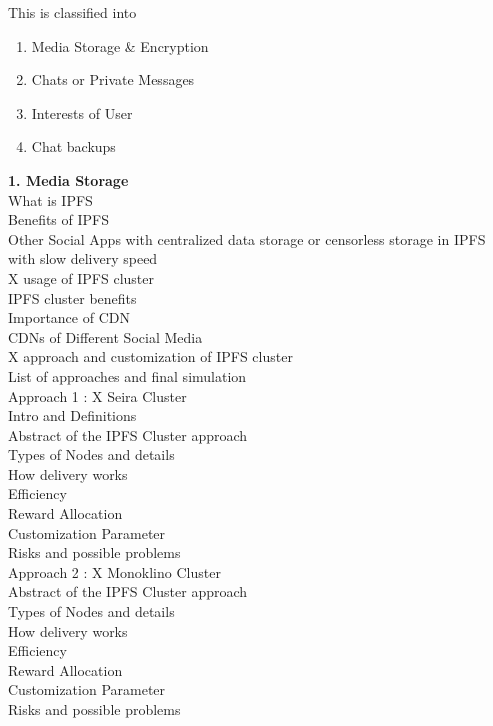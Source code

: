 \documentclass[letterpaper,11pt]{article}
\begin{document}
This is classified into
\begin{enumerate}[wide, labelwidth=!, labelindent=0pt]
\item Media Storage \& Encryption
\item Chats or Private Messages
\item Interests of User
\item Chat backups
\end{enumerate}


\textbf{1. Media Storage}\\

What is IPFS\\
Benefits of IPFS\\
Other Social Apps with centralized data storage or censorless storage in IPFS with slow delivery speed\\
X usage of IPFS cluster\\
IPFS cluster benefits\\
Importance of CDN\\
CDNs of Different Social Media\\
X approach and customization of IPFS cluster\\
List of approaches and final simulation\\

Approach 1 : X Seira Cluster\\

Intro and Definitions\\
Abstract of the IPFS Cluster approach\\
Types of Nodes and details\\
How delivery works\\
Efficiency\\
Reward Allocation\\
Customization Parameter\\
Risks and possible problems\\

Approach 2 : X Monoklino Cluster\\

Abstract of the IPFS Cluster approach\\
Types of Nodes and details\\
How delivery works\\
Efficiency\\
Reward Allocation\\
Customization Parameter\\
Risks and possible problems\\
\end{document}
